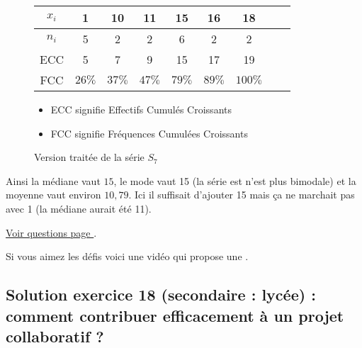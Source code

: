 \begin{enumerate}[label=C\arabic*)]
	\begin{center}
		\begin{figure}[H]
		\caption{Version traitée de la série $S_7$}
		\centering
		\vspace{.5cm}
		\begin{tabular}{*{9}{|c}|}
			\hline
			$x_i$ & 1 & 10 & 11 & 15 & 16 & 18 \\
			\hline
			$n_i$ & 5 & 2 & 2 & 6 & 2 & 2 \\
			\hline
			ECC & 5 & 7 & 9 & 15 & 17 & 19\\
			\hline
			FCC & $26\%$ & $37\%$ & $47\%$ & $79\%$ & $89\%$ & $100\%$  \\
			\hline
		\end{tabular}
			\vspace{.5cm}
			\begin{itemize}
				\item ECC signifie Effectifs Cumulés Croissants
				\item FCC signifie Fréquences Cumulées Croissants
			\end{itemize}
		\end{figure}
	\end{center}
	
	
	Ainsi la médiane vaut $15$, le mode vaut 15 (la série est n'est plus bimodale) et la moyenne vaut environ $10,79$. Ici il suffisait d'ajouter 15 mais ça ne marchait pas avec 1 (la médiane aurait été 11).
\end{enumerate}

\hyperref[calc:niveau17]{Voir questions page \pageref{calc:niveau17}}.

Si vous aimez les défis voici une vidéo qui propose une .

\newpage

\subsection{Solution exercice 18 (secondaire : lycée) : comment contribuer efficacement à un projet collaboratif ?}

\label{sol:niveau18}


